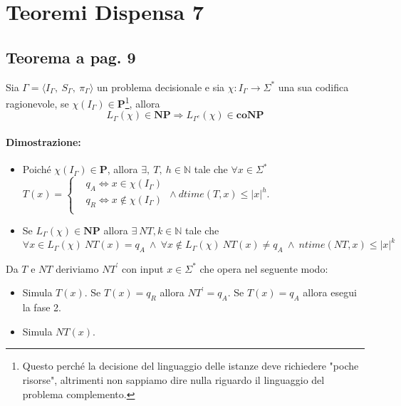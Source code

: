 \section{Teoremi Dispensa 7}

\subsection{Teorema a pag. 9}

Sia $\Gamma = \langle I_{\Gamma},\ S_{\Gamma},\ \pi_{\Gamma} \rangle$ un problema decisionale e sia $\chi: I_{\Gamma} \rightarrow \Sigma^*$
una sua codifica ragionevole, se $\chi(I_{\Gamma}) \in \textbf{P}$\footnote{Questo perché la decisione del linguaggio delle istanze
deve richiedere "poche risorse", altrimenti non sappiamo dire nulla riguardo il linguaggio del problema complemento.}, allora 
\[
L_{\Gamma}(\chi) \in \textbf{NP} \Rightarrow L_{\Gamma^c}(\chi) \in \textbf{coNP} 
\]

\paragraph*{Dimostrazione:}

\begin{itemize}
    \item []{
        Poiché $\chi(I_{\Gamma}) \in \textbf{P}$, allora $\exists,\ T,\ h \in \mathbb{N}$ tale che $\forall x \in \Sigma^*$
        $T(x) =
        \begin{cases} 
            & q_{A} \Leftrightarrow x\in \chi(I_{\Gamma})\\
            & q_{R} \Leftrightarrow x\notin \chi(I_{\Gamma})\\
        \end{cases}$ 
        $\land\ dtime(T, x) \leq |x|^h$.
    }
    \item []{
        Se $L_{\Gamma}(\chi) \in \textbf{NP}$ allora $\exists\ NT, k \in \mathbb{N}$ tale che 
        \[
            \forall x \in L_{\Gamma}(\chi)\ NT(x) = q_{A}\ \land\ \forall x \notin L_{\Gamma}(\chi)\ NT(x)
            \neq q_{A}\ \land\ ntime(NT, x) \leq |x|^k
        \] 
    }
    \end{itemize}
    
Da $T$ e $NT$ deriviamo $NT^{'}$ con input $x \in \Sigma^*$ che opera nel seguente modo:
\begin{itemize}
    \item [FASE 1: ] Simula $T(x)$. Se $T(x) = q_{R}$ allora $NT^{'} = q_{A}$. Se $T(x) = q_{A}$ allora esegui la fase 2.
    \item [FASE 2: ] Simula $NT(x)$.
\end{itemize}

